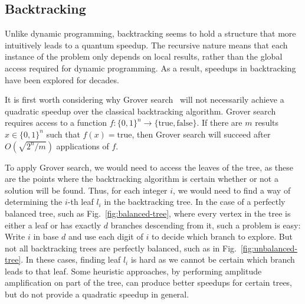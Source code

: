 \subsection{Backtracking}
\label{sec:q-backtrack}

Unlike dynamic programming, backtracking seems to hold a structure that more intuitively leads to a quantum speedup. The recursive nature means that each instance of the problem only depends on local results, rather than the global access required for dynamic programming. As a result, speedups in backtracking have been explored for decades.

It is first worth considering why Grover search~\cite{grover96} will not necessarily achieve a quadratic speedup over the classical backtracking algorithm. Grover search requires access to a function $f \colon \{0,1\}^n \rightarrow \{\text{true}, \text{false}\}$. If there are $m$ results $x \in \{0,1\}^n$ such that $f(x) = \text{true}$, then Grover search will succeed after $O(\sqrt{2^n/m})$ applications of $f$\cite{grover96}.

To apply Grover search, we would need to access the leaves of the tree, as these are the points where the backtracking algorithm is certain whether or not a solution will be found. Thus, for each integer $i$, we would need to find a way of determining the $i$-th leaf $l_i$ in the backtracking tree. In the case of a perfectly balanced tree, such as Fig.\ \ref{fig:balanced-tree}, where every vertex in the tree is either a leaf or has exactly $d$ branches descending from it, such a problem is easy: Write $i$ in base $d$ and use each digit of $i$ to decide which branch to explore. But not all backtracking trees are perfectly balanced, such as in Fig.\ \ref{fig:unbalanced-tree}. In these cases, finding leaf $l_i$ is hard as we cannot be certain which branch leads to that leaf. Some heuristic approaches, by performing amplitude amplification on part of the tree, can produce better speedups for certain trees, but do not provide a quadratic speedup in general.


